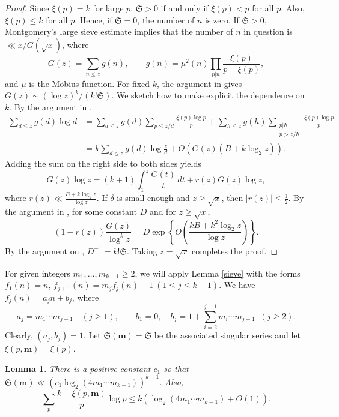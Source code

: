 \documentclass[12pt]{amsart}
\theoremstyle{remark}
\theoremstyle{plain}
\newtheorem{lem}{Lemma}[section]
\numberwithin{equation}{section}
\renewcommand{\SS}{\mathfrak{S}}  %
\newcommand{\be}{\begin{equation}}
\newcommand{\ee}{\end{equation}}
\renewcommand{\(}{\left(}
\renewcommand{\)}{\right)}
\newcommand{\pfrac}[2]{\left(\frac{#1}{#2}\right)}
\newcommand{\mm}{\ensuremath{\mathbf{m}}}
\renewcommand{\le}{\leqslant}
\renewcommand{\ge}{\geqslant}
\begin{document}
\begin{proof}
Since $\xi(p)=k$ for
large $p$, $\SS>0$ if and only if
$\xi(p)<p$ for all $p$.  Also, $\xi(p)\le k$ for all $p$.
Hence, if $\SS=0$, the number of $n$ 
is zero.  If $\SS>0$, 
Montgomery's large sieve estimate \cite[Th\'eor\`eme 6]{Bo} implies
that the number of $n$ in question is $\ll x/G(\sqrt{x})$, where
$$
G(z) = \sum_{n\le z} g(n), \qquad g(n)=\mu^2(n) \prod_{p|n}
\frac{\xi(p)}{p-\xi(p)},
$$
and $\mu$ is the M\"obius function.
For fixed $k$, the argument in \cite[\S 5.3]{HR} gives
$G(z) \sim (\log z)^k/(k! \SS)$.  We sketch how to make explicit the dependence on $k$.
By the argument in \cite[p. 147--148]{HR}, 
\begin{align*}
\sum_{d\le z} g(d)\log d
&= \sum_{d\le z} g(d) \sum_{p\le z/d} \frac{\xi(p)\log p}{p} +
\sum_{h\le z} g(h) \sum_{\substack{p|h \\ p>z/h}} \frac{\xi(p)\log
  p}{p} \\
&= k\sum_{d\le z} g(d) \log \frac{z}{d} + O\(G(z)(B+k\log_2 z) \).
\end{align*}
Adding the sum on the right side to both sides yields
\[
G(z) \log z = (k+1) \int_1^z \frac{G(t)}{t}\, dt +  r(z) G(z)\log z,
\] 
where $r(z) \ll \frac{B+k\log_2 z}{\log z}$.  If
$\delta$ is small enough and $z\ge \sqrt{x}$, then $|r(z)| \le
\frac12$.  By the argument in \cite[p. 150]{HR},  for
some constant $D$ and for $z\ge \sqrt{x}$,
\[
(1-r(z))\frac{G(z)}{\log^k z} 
= D \exp \left\{ O\pfrac{kB+k^2\log_2 z}{\log z} \right\}.
\]
By the argument on \cite[p. 151--152]{HR}, $D^{-1} = k! \SS$.
Taking $z=\sqrt{x}$ completes the proof.
\end{proof}

%
%

For given integers $m_1,\ldots,m_{k-1} \ge 2$, we will apply
Lemma \ref{sieve} with the forms 
$f_1(n)=n$, $f_{j+1}(n)=m_{j} f_j(n)+1 \ (1\le j\le k-1).$
We have $f_j(n)=a_j n + b_j$, where
\be\label{ajbj}
 a_j=m_1\cdots m_{j-1} \quad (j\ge 1), \qquad b_1=0,
\quad  b_j=1 + \sum_{i=2}^{j-1} m_i\cdots m_{j-1} \;\; (j\ge 2). 
\ee
Clearly, $(a_j,b_j)=1$.
Let $\SS(\mm)=\SS$ be the associated singular series and let
$\xi(p,\mm)=\xi(p)$.


\begin{lem}\label{singupper}
There is a positive constant $c_1$ so that
$\SS(\mm) \ll (c_1 \log_2 (4m_1\cdots m_{k-1}))^{k-1}$.
Also,
\[
\sum_p \frac{k-\xi(p,\mm)}{p} \log p \le k\( \log_2 (4m_1 \cdots
m_{k-1})+O(1) \).
\]
\end{lem}
\end{document}
